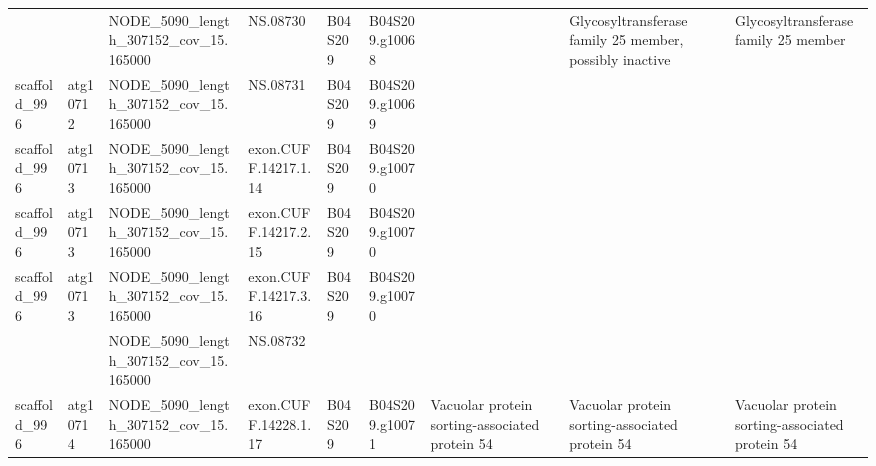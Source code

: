 \begin{longtable}{lllllllll}
                &           &   NODE\_5090\_length\_307152\_cov\_15.165000 &              NS.08730 &      B04S209 &  B04S209.g10068 &                                                                                 &                         Glycosyltransferase family 25 member, possibly inactive &                                            Glycosyltransferase family 25 member \\
   scaffold\_996 &  atg10712 &   NODE\_5090\_length\_307152\_cov\_15.165000 &              NS.08731 &      B04S209 &  B04S209.g10069 &                                                                                 &                                                                                 &                                                                                 \\
   scaffold\_996 &  atg10713 &   NODE\_5090\_length\_307152\_cov\_15.165000 &  exon.CUFF.14217.1.14 &      B04S209 &  B04S209.g10070 &                                                                                 &                                                                                 &                                                                                 \\
   scaffold\_996 &  atg10713 &   NODE\_5090\_length\_307152\_cov\_15.165000 &  exon.CUFF.14217.2.15 &      B04S209 &  B04S209.g10070 &                                                                                 &                                                                                 &                                                                                 \\
   scaffold\_996 &  atg10713 &   NODE\_5090\_length\_307152\_cov\_15.165000 &  exon.CUFF.14217.3.16 &      B04S209 &  B04S209.g10070 &                                                                                 &                                                                                 &                                                                                 \\
                &           &   NODE\_5090\_length\_307152\_cov\_15.165000 &              NS.08732 &              &                 &                                                                                 &                                                                                 &                                                                                 \\
   scaffold\_996 &  atg10714 &   NODE\_5090\_length\_307152\_cov\_15.165000 &  exon.CUFF.14228.1.17 &      B04S209 &  B04S209.g10071 &                                  Vacuolar protein sorting-associated protein 54 &                                  Vacuolar protein sorting-associated protein 54 &                                  Vacuolar protein sorting-associated protein 54 \\

\end{longtable}
